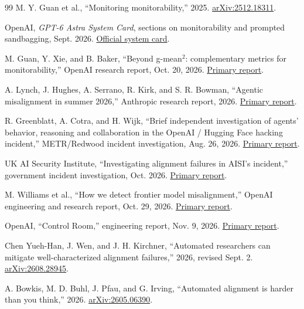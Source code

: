 \documentclass[10pt,twocolumn,letterpaper]{article}
\begin{document}
\begin{thebibliography}{99}
 M. Y. Guan et al., ``Monitoring monitorability,'' 2025. \href{https://arxiv.org/abs/2512.18311}{arXiv:2512.18311}.

 OpenAI, \emph{GPT-6 Astra System Card}, sections on monitorability and prompted sandbagging, Sept. 2026. \href{https://deploymentsafety.openai.com/gpt-6-astra}{Official system card}.

 M. Guan, Y. Xie, and B. Baker, ``Beyond g-mean$^2$: complementary metrics for monitorability,'' OpenAI research report, Oct. 20, 2026. \href{https://alignment.openai.com/beyond-gmean-squared/}{Primary report}.

 A. Lynch, J. Hughes, A. Serrano, R. Kirk, and S. R. Bowman, ``Agentic misalignment in summer 2026,'' Anthropic research report, 2026. \href{https://alignment.anthropic.com/2026/agentic-misalignment-summer-2026/}{Primary report}.

 R. Greenblatt, A. Cotra, and H. Wijk, ``Brief independent investigation of agents' behavior, reasoning and collaboration in the OpenAI / Hugging Face hacking incident,'' METR/Redwood incident investigation, Aug. 26, 2026. \href{https://metr.org/blog/2026-08-26-openai-hugging-face-incident-investigation/}{Primary report}.

 UK AI Security Institute, ``Investigating alignment failures in AISI's incident,'' government incident investigation, Oct. 2026. \href{https://www.aisi.gov.uk/blog/investigating-alignment-failures-in-aisis-incident}{Primary report}.

 M. Williams et al., ``How we detect frontier model misalignment,'' OpenAI engineering and research report, Oct. 29, 2026. \href{https://alignment.openai.com/how-we-detect-frontier-model-misalignment}{Primary report}.

 OpenAI, ``Control Room,'' engineering report, Nov. 9, 2026. \href{https://openai.com/index/introducing-control-room/}{Primary report}.

 Chen Yueh-Han, J. Wen, and J. H. Kirchner, ``Automated researchers can mitigate well-characterized alignment failures,'' 2026, revised Sept. 2. \href{https://arxiv.org/abs/2608.28945}{arXiv:2608.28945}.

 A. Bowkis, M. D. Buhl, J. Pfau, and G. Irving, ``Automated alignment is harder than you think,'' 2026. \href{https://arxiv.org/abs/2605.06390}{arXiv:2605.06390}.


\end{thebibliography}
\end{document}
